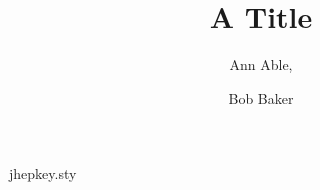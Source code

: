 \begin{filecontents*}[overwrite]{jhepkey.sty}
\newtoks\affil@toks
\renewcommand{\author}[2][]{\gdef\@author{#2}}
\newcommand{\affiliation}[2][]{\affil@toks=\expandafter{\the\affil@toks{\item[$^{#1}$]#2}}}
\def\@maketitle{{\Large\@title\par}\@author\par\begin{list}{}{}\the\affil@toks\end{list}}
\end{filecontents*}
\documentclass{article}
\usepackage{jhepkey}

\title{A Title}
\author[a]{Ann Able,}
\author[a,b]{Bob Baker}
\maketitle
Body.

